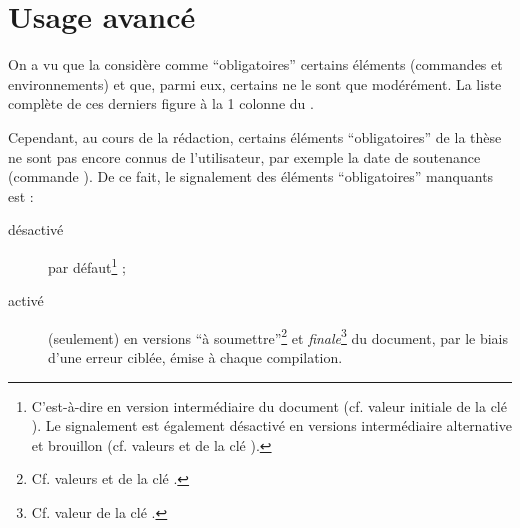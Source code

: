 \chapter{Usage avancé}\label{cha-usage-avance}


On a vu  que la \yatCl{} considère comme
\enquote{obligatoires} certains éléments (commandes et environnements) et que,
parmi eux, certains ne le sont que modérément. La liste complète de ces
derniers figure à la 1\iere{} colonne du .
\begin{table}[ht]
  \centering
  \caption[Éléments modérément \enquote{obligatoires} et désactivation des
  erreurs associées]{Éléments modérément \enquote{obligatoires} et options de
    désactivation des erreurs ciblées associées}
  \label{tab-no-warnings}
  
\end{table}

Cependant, au cours de la rédaction, certains éléments \enquote{obligatoires}
de la thèse ne sont pas encore connus de l'utilisateur, par exemple la date de
soutenance (commande ).
%
De ce fait, le signalement des éléments \enquote{obligatoires} manquants est :
\begin{description}
\item[désactivé] par défaut\footnote{C'est-à-dire en version intermédiaire du
    document (cf. valeur initiale  de la clé
    ). Le signalement est également désactivé en versions
    intermédiaire alternative et brouillon (cf. valeurs 
    et  de la clé ).} ;
\item[activé] (seulement) en versions \enquote{à
    soumettre}\footnote{Cf. valeurs  et
     de la clé .} et
  \emph{finale}\footnote{Cf. valeur  de la clé
    .} du document, par le biais d'une erreur ciblée, émise
  à chaque compilation.
\end{description}

